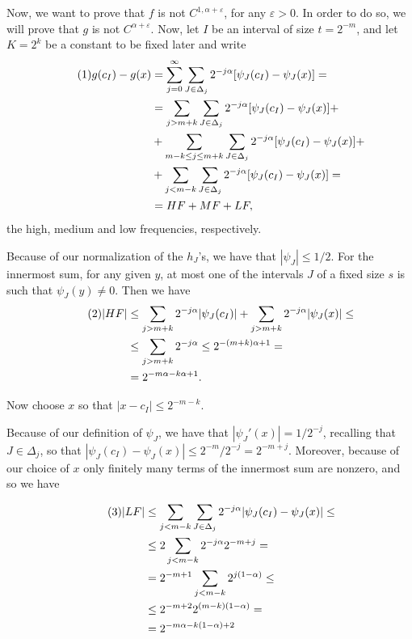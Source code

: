 \documentclass[11pt, twoside, leqno]{article}
\numberwithin{equation}{section}
\newcommand\numberthis{\addtocounter{equation}{1}\tag{\theequation}}
\theoremstyle{plain}
\theoremstyle{definition}
\newcommand{\e}{\varepsilon} %
\begin{document}
Now, we want to prove that $f$ is not $C^{1,\alpha + \e}$, for any $\e>0$. 
In order to do so, we will prove that $g$ is not $C^{\alpha+\e}$. Now, let $I$ be an interval of size $t=2^{-m}$, and let $K=2^k$ be a constant to be fixed later and write
\begin{align*} \numberthis
g(c_I)-g(x) & =\sum_{j=0}^\infty \sum_{J \in \Delta_j} 2^{-j \alpha } [\psi_J(c_I)-\psi_J(x)]= \\
& =  \sum_{j>m+k} \sum_{J \in \Delta_j} 2^{-j \alpha }[\psi_J(c_I)-\psi_J(x)] + \\
& + \sum_{m-k\leq j \leq m+k} \sum_{J \in \Delta_j}2^{-j \alpha }[\psi_J(c_I)-\psi_J(x)] + \\
& + \sum_{j < m-k} \sum_{J \in \Delta_j} 2^{-j \alpha }[\psi_J(c_I)-\psi_J(x)] = \\
& = HF + MF + LF,
\end{align*}
the high, medium and low frequencies, respectively.


Because of our normalization of the $h_J$'s, we have that $|\psi_J|\leq 1/2$. For the innermost sum, for any given $y$, at most one of the intervals $J$ of a fixed size $s$ is such that $\psi_J(y)\neq 0$. Then we have
\begin{align*} \numberthis
|HF| & \leq \sum_{j > m+k} 2^{-j \alpha }|\psi_J(c_I)| + \sum_{j > m+k} 2^{-j \alpha }|\psi_J(x)| \leq  \\
& \leq \sum_{j > m+k} 2^{-j \alpha } \leq 2^{-(m+k)\alpha+1} = \\
& =  2^{-m\alpha - k \alpha +1}.
\end{align*}

Now choose $x$ so that $|x-c_I|\leq 2^{-m-k}$.

Because of our definition of $\psi_J$, we have that $|\psi_J'(x)|=1/2^{-j}$, recalling that $J \in \Delta_j$, so that $|\psi_J(c_I)-\psi_J(x)| \leq 2^{-m}/2^{-j}=2^{-m+j}$. Moreover, because of our choice of $x$ only finitely many terms of the innermost sum are nonzero, and so we have 

\begin{align*} \numberthis
|LF| &\leq  \sum_{j < m-k} \sum_{J \in \Delta_j} 2^{-j \alpha}|\psi_J(c_I)-\psi_J(x)| \leq \\
& \leq  2\sum_{j < m-k} 2^{-j \alpha}2^{-m+j} = \\
& = 2^{-m+1} \sum_{j < m-k} 2^{j(1- \alpha)} \leq \\
& \leq 2^{-m+2} 2^{(m-k)(1-\alpha)} = \\
& = 2^{-m\alpha - k(1-\alpha) +2 } 
\end{align*}
\end{document}
